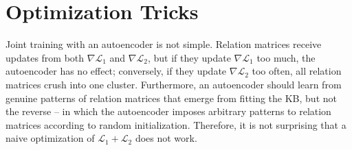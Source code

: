\documentclass[11pt,a4paper]{article}
\newcommand{\mat}[1]{\bm{#1}}
\renewcommand{\vec}[1]{\bm{#1}}
\DeclareMathOperator*{\relu}{ReLU}
\begin{document}

\section{Optimization Tricks}\label{sec:optimizationtricks}

Joint training with an autoencoder is not simple. Relation matrices receive updates 
from both $\nabla\mathcal{L}_1$ and $\nabla\mathcal{L}_2$, but if they update 
$\nabla\mathcal{L}_1$ too much, the autoencoder has no effect; conversely, if they 
update $\nabla\mathcal{L}_2$ too often, all relation matrices crush into one 
cluster. Furthermore, an autoencoder should learn from 
genuine patterns of relation matrices that emerge from fitting the KB, but not 
the reverse -- in which the autoencoder imposes arbitrary patterns to 
relation matrices 
according to random initialization. Therefore, it is not surprising that 
a naive optimization of 
$\mathcal{L}_1+\mathcal{L}_2$ does not work. 
\end{document}
